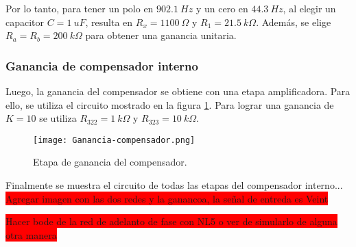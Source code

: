Por lo tanto, para tener un polo en $902.1\:Hz$ y un cero en $44.3\:Hz$, al elegir un capacitor $C = 1\:uF$, resulta en $R_x = 1100\:\Omega$ y $R_1 = 21.5\:k\Omega$. Además, se elige $R_a = R_b = 200\:k\Omega$ para obtener una ganancia unitaria. 


\subsubsection{Ganancia de compensador interno}

Luego, la ganancia del compensador se obtiene con una etapa amplificadora.
Para ello, se utiliza el circuito mostrado en la figura \ref{fig:ganancia-compensador}. Para lograr una ganancia de $K=10$ se utiliza $R_{322} = 1\:k\Omega$ y $R_{323} = 10\:k\Omega$.


\begin{figure}[H]
	\centering
	\texttt{[image: Ganancia-compensador.png]}
	\caption{Etapa de ganancia del compensador.}
	\label{fig:ganancia-compensador}
\end{figure}


Finalmente se muestra el circuito de todas las etapas del compensador interno...
\colorbox{red}{Agregar imagen con las dos redes y la ganancoa, la señal de entreda es Veint}

\colorbox{red}{Hacer bode de la red de adelanto de fase con NL5 o ver de simularlo de alguna otra manera}